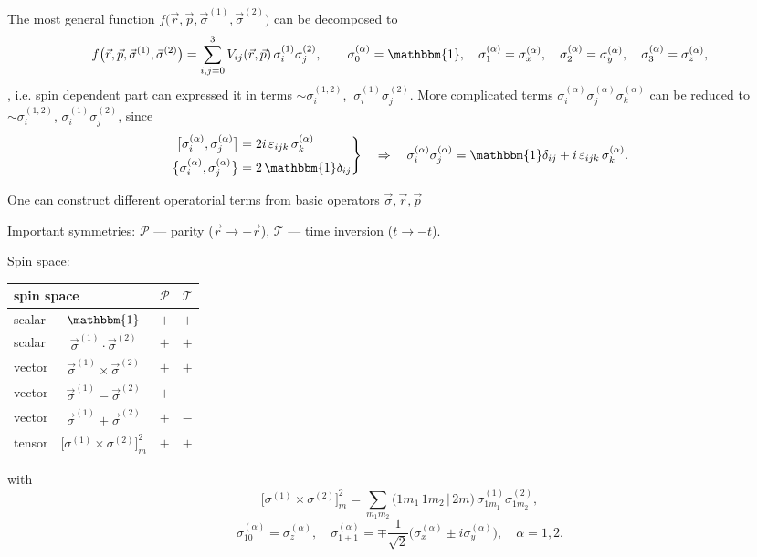\documentclass[11pt,a4paper]{article}
\begin{document}
The most general function $f\big(\vec r,\vec p,\vec\sigma^{(1)},\vec\sigma^{(2)}\big)$ can be decomposed to
\[
f\big(\vec r,\vec p,\vec\sigma^{(1)},\vec\sigma^{(2)}\big)
=\sum_{i,j=0}^{3}V_{ij}(\vec r,\vec p)\,\sigma_i^{(1)}\sigma_j^{(2)},
\qquad
\sigma_0^{(\alpha)}=\mathbbm{1} ,\quad \sigma_1^{(\alpha)}=\sigma_x^{(\alpha)},\quad \sigma_2^{(\alpha)}=\sigma_y^{(\alpha)},\quad \sigma_3^{(\alpha)}=\sigma_z^{(\alpha)},
\]
, i.e. spin dependent part can expressed it in terms $\sim\sigma_i^{(1,2)}$, $\ \sigma_i^{(1)}\sigma_j^{(2)}$.
More complicated terms $\sigma_i^{(\alpha)}\sigma_j^{(\alpha)}\sigma_k^{(\alpha)}$
can be reduced to $\sim\sigma_i^{(1,2)}$, $\sigma_i^{(1)}\sigma_j^{(2)}$, since
\[
\left.
\begin{aligned}
\big[\sigma_i^{(\alpha)},\sigma_j^{(\alpha)}\big]&=2i\,\varepsilon_{ijk}\,\sigma_k^{(\alpha)}\\
\big\{\sigma_i^{(\alpha)},\sigma_j^{(\alpha)}\big\}&=2\,\mathbbm{1} \delta_{ij}
\end{aligned}
\right\}
\quad\Rightarrow\quad
\sigma_i^{(\alpha)}\sigma_j^{(\alpha)}=\mathbbm{1} \delta_{ij}+i\,\varepsilon_{ijk}\,\sigma_k^{(\alpha)} .
\]

One can construct different operatorial terms from basic operators $\vec \sigma,\vec r,\vec p$ 

Important symmetries:
$\mathcal P$ --- parity ($\vec r\to-\vec r$), $\mathcal T$ --- time inversion ($t\to-t$).

Spin space:
\begin{center}
\renewcommand{\arraystretch}{1.3}
\begin{tabular}{l c c c}
\hline
\multicolumn{2}{l}{spin space} & $\mathcal P$ & $\mathcal T$ \\
\hline
scalar & $\mathbbm{1}$ & $+$ & $+$ \\
scalar & $\vec\sigma^{(1)}\!\cdot\vec\sigma^{(2)}$ & $+$ & $+$ \\
vector & $\vec\sigma^{(1)}\times\vec\sigma^{(2)}$ & $+$ & $+$ \\
vector & $\vec\sigma^{(1)}-\vec\sigma^{(2)}$ & $+$ & $-$ \\
vector & $\vec\sigma^{(1)}+\vec\sigma^{(2)}$ & $+$ & $-$ \\
tensor & $\big[\sigma^{(1)}\times\sigma^{(2)}\big]^2_m$ & $+$ & $+$ \\
\hline
\end{tabular}
\end{center}
with
\[
\big[\sigma^{(1)}\times\sigma^{(2)}\big]^2_m=\sum_{m_1m_2}\big(1m_1\,1m_2\,|\,2m\big)\,
\sigma^{(1)}_{1m_1}\sigma^{(2)}_{1m_2},
\]
\[
\sigma^{(\alpha)}_{10}=\sigma^{(\alpha)}_z,\quad
\sigma^{(\alpha)}_{1\pm1}=\mp\frac{1}{\sqrt2}\big(\sigma^{(\alpha)}_x\pm i\sigma^{(\alpha)}_y\big),
\quad \alpha=1,2 .
\]
\end{document}
